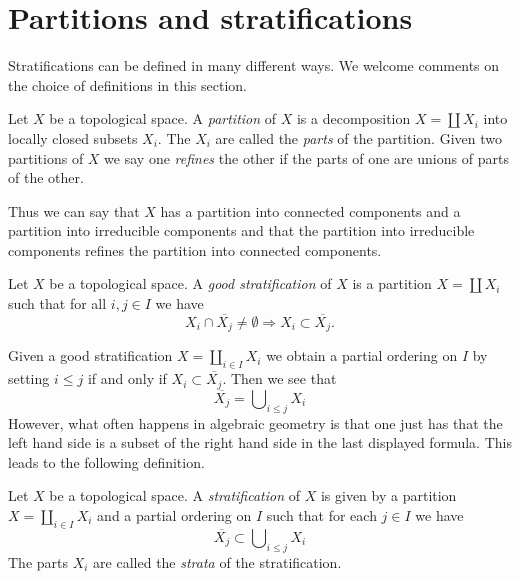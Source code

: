 \section{Partitions and stratifications}
\label{section-stratifications}

\noindent
Stratifications can be defined in many different ways. We welcome
comments on the choice of definitions in this section.

\begin{definition}
\label{definition-paritition}
Let $X$ be a topological space. A {\it partition} of $X$ is a
decomposition $X = \coprod X_i$ into locally closed subsets $X_i$.
The $X_i$ are called the {\it parts} of the partition.
Given two partitions of $X$ we say one {\it refines} the other if
the parts of one are unions of parts of the other.
\end{definition}

\noindent
Thus we can say that $X$ has a partition into connected components
and a partition into irreducible components and that the partition
into irreducible components refines the partition into connected
components.

\begin{definition}
\label{definition-good-stratification}
Let $X$ be a topological space. A {\it good stratification}
of $X$ is a partition $X = \coprod X_i$ such that for all
$i, j \in I$ we have
$$
X_i \cap \overline{X_j} \not = \emptyset
\Rightarrow
X_i \subset \overline{X_j}.
$$
\end{definition}

\noindent
Given a good stratification $X = \coprod_{i \in I} X_i$ we obtain
a partial ordering on $I$ by setting $i \leq j$ if and only if
$X_i \subset \overline{X_j}$. Then we see that
$$
\overline{X_j} = \bigcup\nolimits_{i \leq j} X_i
$$
However, what often happens in algebraic geometry is that one just
has that the left hand side is a subset of the right hand side in
the last displayed formula. This leads to the following definition.

\begin{definition}
\label{definition-stratification}
Let $X$ be a topological space. A {\it stratification} of $X$ is
given by a partition $X = \coprod_{i \in I} X_i$ and a partial ordering
on $I$ such that for each $j \in I$ we have
$$
\overline{X_j} \subset \bigcup\nolimits_{i \leq j} X_i
$$
The parts $X_i$ are called the {\it strata} of the stratification.
\end{definition}

